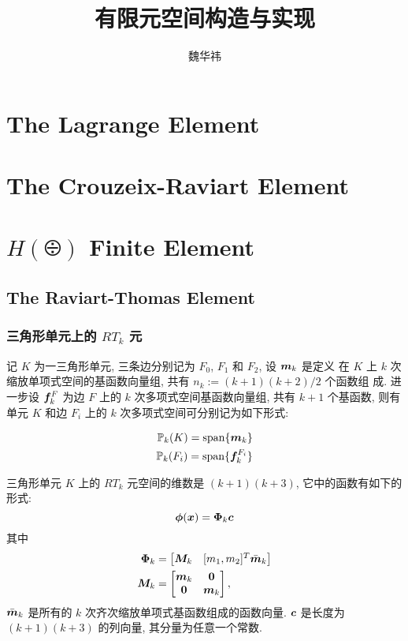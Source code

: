 \documentclass{article}
\begin{document}
\title{有限元空间构造与实现}
\author{魏华祎}
\date{\chntoday}
\maketitle
\section{The Lagrange Element}

\section{The Crouzeix-Raviart Element}

\section{$H(\odiv)$ Finite Element}

\subsection{The Raviart-Thomas Element}

\subsubsection{三角形单元上的 $RT_k$ 元}
记 $K$ 为一三角形单元, 三条边分别记为 $F_0$, $F_1$ 和 $F_2$, 设 ${\boldsymbol m}_k$ 是定义
在 $K$ 上 $k$ 次缩放单项式空间的基函数向量组, 共有 $n_k:=(k+1)(k+2)/2$ 个函数组
成. 进一步设 ${\boldsymbol f}_{k}^F$ 为边 $F$ 上的 $k$ 次多项式空间基函数向量组, 共有 $k+1$
个基函数, 则有单元 $K$ 和边 $F_i$ 上的 $k$ 次多项式空间可分别记为如下形式:

\begin{align*}
    {\mathbb P}_k(K) = \operatorname{span}\{{\boldsymbol m}_k\}\\
    {\mathbb P}_k(F_i) = \operatorname{span}\{{\boldsymbol f}_k^{F_i}\}
\end{align*}

三角形单元 $K$ 上的 $RT_k$ 元空间的维数是 $(k+1)(k+3)$, 它中的函数有如下的形式:  
\begin{equation}
    {\bm \phi}({\boldsymbol x}) = {\bm \Phi}_{k}{\boldsymbol c} 
\end{equation}
其中
\begin{align*}
{\bm \Phi}_k &= 
    \begin{bmatrix}
        {\boldsymbol M}_k & [m_1, m_2]^T \bar{{\boldsymbol m}}_k\\ 
    \end{bmatrix} \\
{\boldsymbol M}_k &= 
    \begin{bmatrix}
        {\boldsymbol m}_{k} & \mathbf 0 \\ 
        \mathbf 0 & {\boldsymbol m}_{k} 
    \end{bmatrix},
\end{align*}
$\bar{{\boldsymbol m}}_k$ 是所有的 $k$ 次齐次缩放单项式基函数组成的函数向量.  ${\boldsymbol c}$ 是长度为
$(k+1)(k+3)$ 的列向量, 其分量为任意一个常数.
\end{document}
